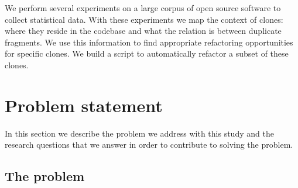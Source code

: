 We perform several experiments on a large corpus of open source software to collect statistical data. With these experiments we map the context of clones: where they reside in the codebase and what the relation is between duplicate fragments. We use this information to find appropriate refactoring opportunities for specific clones. We build a script to automatically refactor a subset of these clones.

\section{Problem statement}
In this section we describe the problem we address with this study and the research questions that we answer in order to contribute to solving the problem.

\subsection{The problem}

